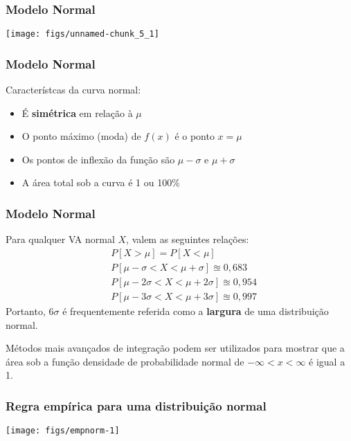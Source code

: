 \documentclass[11pt]{beamer}
\begin{document}
\begin{frame}
\frametitle{Modelo Normal}

\begin{center}\texttt{[image: figs/unnamed-chunk\_5\_1]} \end{center}
\end{frame}

\begin{frame}
\frametitle{Modelo Normal}

Característcas da curva normal:

\begin{itemize}
\item
  É \textbf{simétrica} em relação à \(\mu\)
\item
  O ponto máximo (moda) de \(f(x)\) é o ponto \(x=\mu\)
\item
  Os pontos de inflexão da função são \(\mu-\sigma\) e \(\mu+\sigma\)
\item
  A área total sob a curva é 1 ou 100\%
\end{itemize}
\end{frame}

\begin{frame}
\frametitle{Modelo Normal}

Para qualquer VA normal \(X\), valem as seguintes relações:
\begin{align*}
&P[X > \mu] = P[X < \mu] \\
&P[\mu - \sigma < X < \mu + \sigma] \approxeq 0,683 \\
&P[\mu - 2\sigma < X < \mu + 2\sigma] \approxeq 0,954 \\
&P[\mu - 3\sigma < X < \mu + 3\sigma] \approxeq 0,997
\end{align*} Portanto, \(6\sigma\) é frequentemente referida como a
\textbf{largura} de uma distribuição normal.

Métodos mais avançados de integração podem ser utilizados para mostrar
que a área sob a função densidade de probabilidade normal de
\(-\infty < x < \infty\) é igual a 1.
\end{frame}

\begin{frame}
\frametitle{Regra empírica para uma distribuição normal}

\begin{center}\texttt{[image: figs/empnorm-1]} \end{center}
\end{frame}
\end{document}
